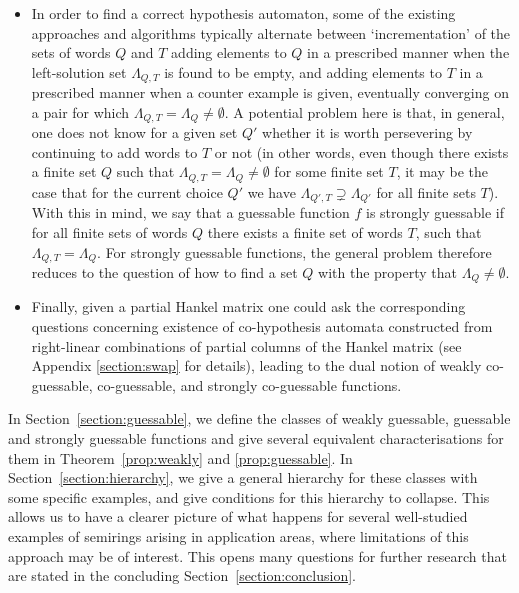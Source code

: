 \documentclass{lmcs}
\numberwithin{theorem}{section}
\begin{document}
\begin{itemize}
is guaranteed to succeed on the 
class of guessable functions (since $\Lambda_{Q,T}=\Lambda_Q \neq \emptyset$ holds for at least one pair).
\item In order to find a correct hypothesis automaton, some of the existing approaches and algorithms typically alternate between `incrementation' of the sets of words $Q$ and $T$ adding elements to $Q$ in a prescribed manner when the left-solution set $\Lambda_{Q,T}$ is found to be empty, and adding elements to $T$ in a prescribed manner when a counter example is given, eventually converging on a pair for which $\Lambda_{Q, T} = \Lambda_Q \neq \emptyset$. A potential problem here is that, in general, one does not know for a given set $Q'$  whether it is worth persevering by continuing to add words to $T$ or not (in other words, even though there exists a finite set $Q$ such that $\Lambda_{Q,T} = \Lambda_Q \neq \emptyset$ for some finite set $T$, it may be the case that for the current choice $Q'$ we have $\Lambda_{Q', T} \supsetneq \Lambda_{Q'}$  for all finite sets $T$). With this in mind, we say that a guessable function $f$ is strongly guessable if for all finite sets of words $Q$ there exists a finite set of words $T$, such that $\Lambda_{Q,T}=\Lambda_Q$. For strongly guessable functions, the general problem therefore reduces to the question of how to find a set $Q$ with the property that $\Lambda_{Q} \neq \emptyset$.
\item Finally, given a partial Hankel matrix one could ask the corresponding questions concerning existence of co-hypothesis automata constructed from right-linear combinations of partial columns of the Hankel matrix (see Appendix \ref{section:swap} for details), leading to the dual notion of weakly co-guessable, co-guessable, and strongly co-guessable functions.
\end{itemize}
\noindent %
In Section~\ref{section:guessable}, we define the classes of weakly guessable, guessable and strongly guessable functions and give several equivalent characterisations for them in Theorem~\ref{prop:weakly} and \ref{prop:guessable}. In Section~\ref{section:hierarchy}, we give a general hierarchy for these classes with some specific  examples, and give conditions for this hierarchy to collapse. This allows us to have a clearer picture of what happens for several well-studied examples of semirings arising in application areas, where limitations of this approach may be of interest.  This opens many questions for further research that are stated in the concluding Section~\ref{section:conclusion}. 
\end{document}
